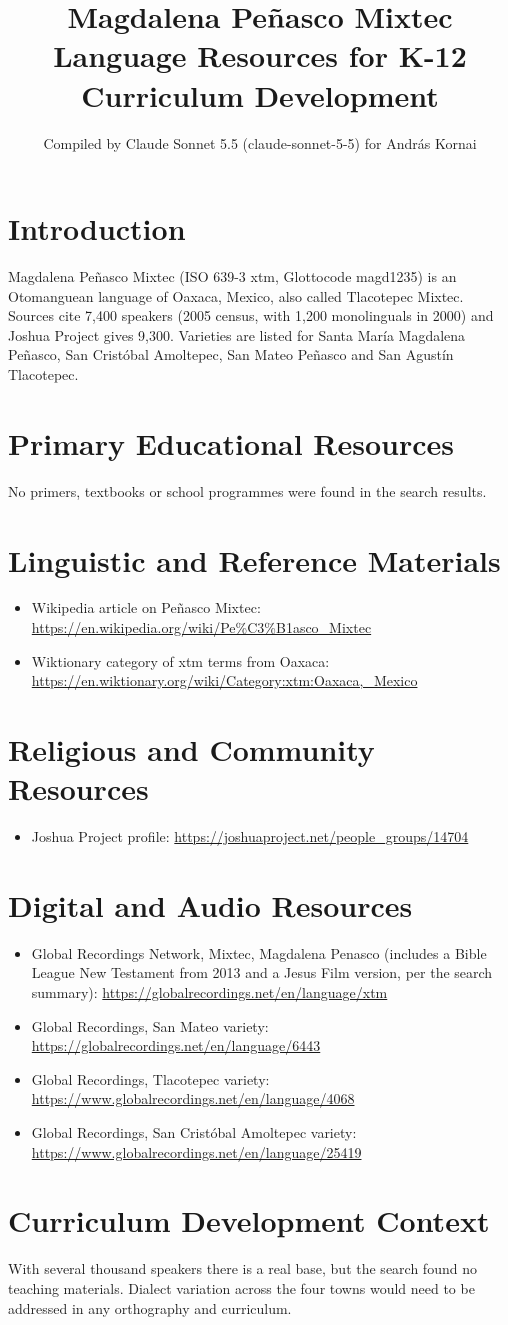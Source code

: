 \documentclass[12pt]{article}
\title{Magdalena Pe\~nasco Mixtec Language Resources for K-12 Curriculum Development}
\author{Compiled by Claude Sonnet 5.5 (claude-sonnet-5-5) for Andr\'as Kornai}
\date{}
\begin{document}
\maketitle
\section{Introduction}
Magdalena Pe\~nasco Mixtec (ISO 639-3 xtm, Glottocode magd1235) is an Otomanguean language of Oaxaca, Mexico, also called Tlacotepec Mixtec. Sources cite 7,400 speakers (2005 census, with 1,200 monolinguals in 2000) and Joshua Project gives 9,300. Varieties are listed for Santa Mar\'ia Magdalena Pe\~nasco, San Crist\'obal Amoltepec, San Mateo Pe\~nasco and San Agust\'in Tlacotepec.
\section{Primary Educational Resources}
No primers, textbooks or school programmes were found in the search results.
\section{Linguistic and Reference Materials}
\begin{itemize}
\item Wikipedia article on Pe\~nasco Mixtec: \url{https://en.wikipedia.org/wiki/Pe%C3%B1asco_Mixtec}
\item Wiktionary category of xtm terms from Oaxaca: \url{https://en.wiktionary.org/wiki/Category:xtm:Oaxaca,_Mexico}
\end{itemize}
\section{Religious and Community Resources}
\begin{itemize}
\item Joshua Project profile: \url{https://joshuaproject.net/people_groups/14704}
\end{itemize}
\section{Digital and Audio Resources}
\begin{itemize}
\item Global Recordings Network, Mixtec, Magdalena Penasco (includes a Bible League New Testament from 2013 and a Jesus Film version, per the search summary): \url{https://globalrecordings.net/en/language/xtm}
\item Global Recordings, San Mateo variety: \url{https://globalrecordings.net/en/language/6443}
\item Global Recordings, Tlacotepec variety: \url{https://www.globalrecordings.net/en/language/4068}
\item Global Recordings, San Crist\'obal Amoltepec variety: \url{https://www.globalrecordings.net/en/language/25419}
\end{itemize}
\section{Curriculum Development Context}
With several thousand speakers there is a real base, but the search found no teaching materials. Dialect variation across the four towns would need to be addressed in any orthography and curriculum.
\end{document}
